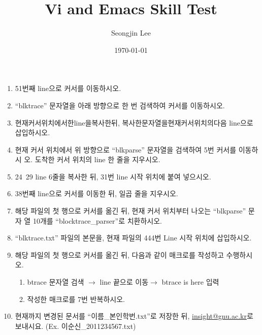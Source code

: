 \documentclass{article}
\title{Vi and Emacs Skill Test}
\author{Seongjin Lee}
\date{\today}
\begin{document}
\maketitle 

\noindent
{}

\begin{enumerate}
\item 51번째 line으로 커서를 이동하시오.
\item ``blktrace'' 문자열을 아래 방향으로 한 번 검색하여 커서를 이동하시오.
\item 현재커서위치에서한line을복사한뒤, 복사한문자열을현재커서위치의다음 line으로 삽입하시오.
\item 현재 커서 위치에서 위 방향으로 ``blkparse'' 문자열을 검색하여 5번 커서를 이동하시 오. 도착한 커서 위치의 line 한 줄을 지우시오.
\item 24~29 line 6줄을 복사한 뒤, 31번 line 시작 위치에 붙여 넣으시오.
\item 38번째 line으로 커서를 이동한 뒤, 일곱 줄을 지우시오.
\item 해당 파일의 첫 행으로 커서를 옮긴 뒤, 현재 커서 위치부터 나오는 ``blkparse'' 문자 열 10개를 ``blocktrace\_parser''로 치환하시오.
\item ``blktrace.txt'' 파일의 본문을, 현재 파일의 444번 Line 시작 위치에 삽입하시오.
\item 해당 파일의 첫 행으로 커서를 옮긴 뒤, 다음과 같이 매크로를 작성하고 수행하시오.
\begin{enumerate}
\item btrace 문자열 검색 $\rightarrow$ line 끝으로 이동$\rightarrow$ btrace is here 입력
\item 작성한 매크로를 7번 반복하시오.
\end{enumerate}
\item 현재까지 변경된 문서를 ``이름\_본인학번.txt''로 저장한 뒤, \href{mailto:insight@gnu.ac.kr}{insight@gnu.ac.kr}로 보내시요. (Ex. 이순신\_2011234567.txt)
\end{enumerate}
\end{document}
